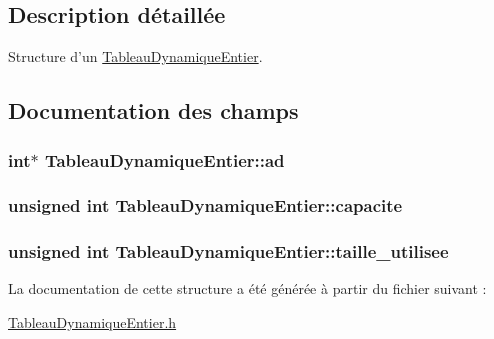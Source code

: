 \subsection{Description détaillée}
Structure d'un \hyperlink{structTableauDynamiqueEntier}{Tableau\-Dynamique\-Entier}. 

\subsection{Documentation des champs}
\hypertarget{structTableauDynamiqueEntier_a2ebf85c435f6e7db67050c4fbcaf62a9}{
\subsubsection[{ad}]{\setlength{\rightskip}{0pt plus 5cm}int$\ast$ Tableau\-Dynamique\-Entier\-::ad}}\label{structTableauDynamiqueEntier_a2ebf85c435f6e7db67050c4fbcaf62a9}
\hypertarget{structTableauDynamiqueEntier_a1fbdd8e4a11ba95e5a802fe9bb6cc2ff}{
\subsubsection[{capacite}]{\setlength{\rightskip}{0pt plus 5cm}unsigned int Tableau\-Dynamique\-Entier\-::capacite}}\label{structTableauDynamiqueEntier_a1fbdd8e4a11ba95e5a802fe9bb6cc2ff}
\hypertarget{structTableauDynamiqueEntier_ac7a23b3a002b4ce72556a1d5cebd3025}{
\subsubsection[{taille\-\_\-utilisee}]{\setlength{\rightskip}{0pt plus 5cm}unsigned int Tableau\-Dynamique\-Entier\-::taille\-\_\-utilisee}}\label{structTableauDynamiqueEntier_ac7a23b3a002b4ce72556a1d5cebd3025}


La documentation de cette structure a été générée à partir du fichier suivant \-:\begin{DoxyCompactItemize}
\item 
\hyperlink{TableauDynamiqueEntier_8h}{Tableau\-Dynamique\-Entier.\-h}\end{DoxyCompactItemize}
